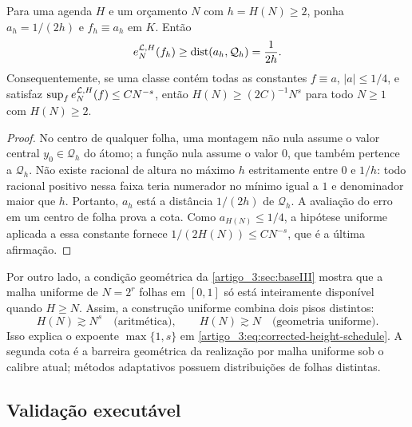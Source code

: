\begin{proposition}\label{map:artigo_3:4.6}
\label{artigo_3:prop:arithmetic-floor}
Para uma agenda $H$ e um orçamento $N$ com $h=H(N)\ge2$,
ponha $a_h=1/(2h)$ e $f_h\equiv a_h$ em $K$. Então
\begin{equation}
 e_N^{\mathcal{L},H}(f_h)
 \ge\operatorname{dist}(a_h,\mathcal Q_h)
 =\frac1{2h}.
 \label{artigo_3:eq:arithmetic-floor}
\end{equation}
Consequentemente, se uma classe contém todas as constantes
$f\equiv a$, $|a|\le1/4$, e satisfaz
$\sup_f e_N^{\mathcal{L},H}(f)\le C N^{-s}$, então
$H(N)\ge(2C)^{-1}N^s$ para todo $N\ge1$ com $H(N)\ge2$.
\end{proposition}

\begin{proof}
No centro de qualquer folha, uma montagem não nula assume o valor central
$y_0\in\mathcal Q_h$ do átomo; a função nula assume o valor $0$, que também
pertence a $\mathcal Q_h$. Não existe racional de altura no máximo $h$
estritamente entre $0$ e $1/h$: todo racional positivo nessa faixa teria
numerador no mínimo igual a $1$ e denominador maior que $h$. Portanto,
$a_h$ está a distância $1/(2h)$ de $\mathcal Q_h$. A avaliação do erro em um
centro de folha prova a cota. Como $a_{H(N)}\le1/4$, a hipótese uniforme
aplicada a essa constante fornece
$1/(2H(N))\le CN^{-s}$, que é a última afirmação.
\end{proof}

Por outro lado, a condição geométrica da \cref{artigo_3:sec:baseIII} mostra que a malha
uniforme de $N=2^r$ folhas em $[0,1]$ só está inteiramente disponível quando
$H\ge N$. Assim, a construção uniforme combina dois pisos distintos:
\begin{equation}
 H(N)\gtrsim N^s\quad\text{(aritmética)},
 \qquad
 H(N)\gtrsim N\quad\text{(geometria uniforme)}.
 \label{artigo_3:eq:two-height-floors}
\end{equation}
Isso explica o expoente $\max\{1,s\}$ em
\eqref{artigo_3:eq:corrected-height-schedule}. A segunda cota é a barreira geométrica
da realização por malha uniforme sob o calibre atual; métodos adaptativos
possuem distribuições de folhas distintas.

\subsection{Validação executável}

